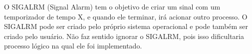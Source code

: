 \begin{question}

    O SIGALRM (Signal Alarm) tem o objetivo de criar um sinal 
    com um temporizador de tempo X, e quando ele terminar, irá
    acionar outro processo. O SIGALRM pode ser criado pelo próprio 
    sistema operacional e pode também ser criado pelo usuário. Não faz
    sentido ignorar o SIGALRM, pois isso dificultaria processo lógico
    na qual ele foi implementado.

\end{question}